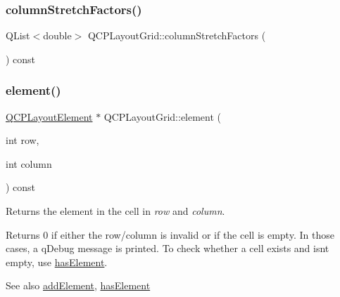 \mbox{\label{class_q_c_p_layout_grid_a8e0e587c386bbcd1b94119f5f44c512d}} 
\subsubsection{\texorpdfstring{columnStretchFactors()}{columnStretchFactors()}}
{\footnotesize\ttfamily Q\+List$<$double$>$ Q\+C\+P\+Layout\+Grid\+::column\+Stretch\+Factors (\begin{DoxyParamCaption}{ }\end{DoxyParamCaption}) const\hspace{0.3cm}{\ttfamily [inline]}}

\mbox{\label{class_q_c_p_layout_grid_a602b426609b4411cf6a93c3ddf3a381a}} 
\subsubsection{\texorpdfstring{element()}{element()}}
{\footnotesize\ttfamily \mbox{\hyperlink{class_q_c_p_layout_element}{Q\+C\+P\+Layout\+Element}} $\ast$ Q\+C\+P\+Layout\+Grid\+::element (\begin{DoxyParamCaption}\item[{int}]{row,  }\item[{int}]{column }\end{DoxyParamCaption}) const}

Returns the element in the cell in {\itshape row} and {\itshape column}.

Returns 0 if either the row/column is invalid or if the cell is empty. In those cases, a q\+Debug message is printed. To check whether a cell exists and isn\textquotesingle{}t empty, use \mbox{\hyperlink{class_q_c_p_layout_grid_ab0cf4f7edc9414a3bfaddac0f46dc0a0}{has\+Element}}.

\begin{DoxySeeAlso}{See also}
\mbox{\hyperlink{class_q_c_p_layout_grid_adff1a2ca691ed83d2d24a4cd1fe17012}{add\+Element}}, \mbox{\hyperlink{class_q_c_p_layout_grid_ab0cf4f7edc9414a3bfaddac0f46dc0a0}{has\+Element}} 
\end{DoxySeeAlso}
\mbox{\label{class_q_c_p_layout_grid_a4288f174082555f6bd92021bdedb75dc}} 
